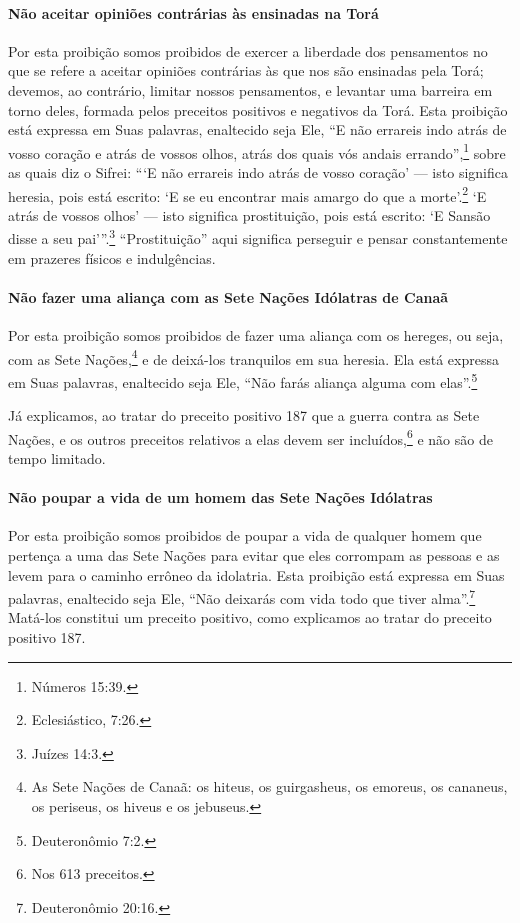 \paragraph{Não aceitar opiniões contrárias às ensinadas na Torá}

Por esta proibição somos proibidos de exercer a liberdade dos
pensamentos no que se refere a aceitar opiniões contrárias às que nos
são ensinadas pela Torá; devemos, ao contrário, limitar nossos
pensamentos, e levantar uma barreira em torno deles, formada pelos
preceitos positivos e negativos da Torá. Esta proibição está expressa
em Suas palavras, enaltecido seja Ele, ``E não errareis indo atrás de
vosso coração e atrás de vossos olhos, atrás dos quais vós andais
errando'',\footnote{Números 15:39.} sobre as quais diz o Sifrei: ```E não
errareis indo atrás de vosso coração' --- isto significa heresia, pois
está escrito: `E se eu encontrar mais amargo do que a
morte'.\footnote{Eclesiástico, 7:26.} `E atrás de vossos olhos' --- isto
significa prostituição, pois está escrito: `E Sansão disse a seu
pai'''.\footnote{Juízes 14:3.} ``Prostituição'' aqui significa perseguir
e pensar constantemente em prazeres físicos e indulgências.

\paragraph{Não fazer uma aliança com as Sete Nações Idólatras de Canaã}

Por esta proibição somos proibidos de fazer uma aliança com os hereges,
ou seja, com as Sete Nações,\footnote{As Sete Nações de Canaã: os hiteus, os guirgasheus, os emoreus, os cananeus, os periseus, os hiveus e os jebuseus.} e de deixá-los tranquilos em sua heresia. Ela está expressa em Suas palavras,
enaltecido seja Ele, ``Não farás aliança alguma com elas''.\footnote{Deuteronômio
7:2.}

Já explicamos, ao tratar do preceito positivo 187 que a guerra contra as Sete Nações, e os outros preceitos relativos a elas devem ser
incluídos,\footnote{Nos 613 preceitos.} e não são de tempo limitado.

\paragraph{Não poupar a vida de um homem das Sete Nações Idólatras}

Por esta proibição somos proibidos de poupar a vida de qualquer homem
que pertença a uma das Sete Nações para evitar que eles corrompam as
pessoas e as levem para o caminho errôneo da idolatria. Esta proibição
está expressa em Suas palavras, enaltecido seja Ele, ``Não deixarás com
vida todo que tiver alma''.\footnote{Deuteronômio 20:16.} Matá-los constitui um
preceito positivo, como explicamos ao tratar do preceito positivo 187.

